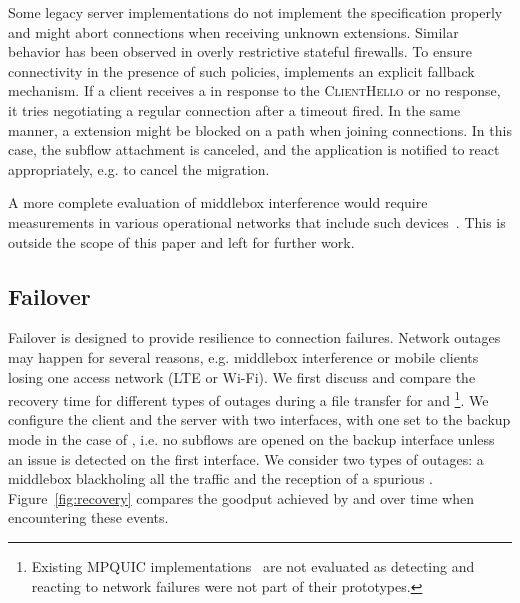 Some legacy \tls server implementations do not implement the \tls
specification properly and might abort connections when receiving unknown \tls
extensions. Similar behavior has been observed in overly restrictive stateful
firewalls. To ensure connectivity in the presence of such policies, \tcpls
implements an explicit fallback mechanism. If a client receives a \tcp \rst in
response to the \tcpls \textsc{ClientHello} or no response, it
tries negotiating a regular \tls connection after a timeout fired. 
In the same manner, a \join extension might be
blocked on a path when joining connections. In this case, the subflow 
attachment is canceled, and
the application is notified to react appropriately, e.g. to cancel the 
migration.

A more complete evaluation of middlebox interference would require measurements 
in various operational networks that include such 
devices~\cite{honda2011still,raman2020measuring,o2016tls}. This is
outside the scope of this paper and left for further work. 



\subsection{Failover}
\label{sec:eval_failover}

Failover is designed to provide resilience to \tcpls connection
failures. Network outages may happen
for several reasons, e.g. middlebox interference or mobile clients losing
one access network (LTE or Wi-Fi). 
We first discuss and compare the recovery time
for different types of outages during a file transfer for \tcpls and \mptcp
\footnote{Existing MPQUIC implementations~\cite{de2017multipath, 
de2019pluginizing} are not evaluated as detecting and reacting to network 
failures were not part of their prototypes.}.
We configure the client 
and the server with two interfaces, with one set to the 
backup mode in the case of \mptcp, i.e. no subflows are opened on the backup 
interface unless an issue is detected on the first interface. 
We consider two 
types of outages: a middlebox blackholing all the traffic and the reception of a 
spurious \rst.
Figure~\ref{fig:recovery}
compares the goodput achieved by \mptcp and \tcpls over time when encountering 
these events.

